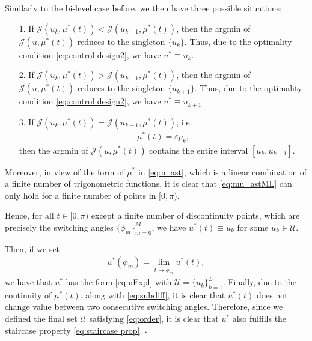 \documentclass[twocolumn]{autart}    %
\begin{document}
Similarly to the bi-level case before, we then have three possible situations:
\begin{itemize}
	\item[1.] If $\mathcal{J}(u_k,\mu^\ast(t)) <  \mathcal{J}(u_{k+1},\mu^\ast(t))$, then the argmin of $\mathcal{J} (u,\mu^\ast(t))$ reduces to the singleton $\{u_k\}$. Thus, due to the optimality condition \eqref{eq:control design2}, we have $u^\ast\equiv u_k$.
	\vspace{0.2cm}
	\item[2.] If $\mathcal{J}(u_k,\mu^\ast(t)) >  \mathcal{J}(u_{k+1},\mu^\ast(t))$, then the argmin of $\mathcal{J} (u,\mu^\ast(t))$ reduces to the singleton $\{u_{k+1}\}$. Thus, due to the optimality condition \eqref{eq:control design2}, we have $u^\ast\equiv u_{k+1}$.
	\vspace{0.2cm}
	\item[3.] If $\mathcal{J}(u_k,\mu^\ast(t)) =  \mathcal{J}(u_{k+1},\mu^\ast(t))$, i.e. 
	\begin{align}\label{eq:mu_astML}
		\mu^\ast (t) = \varepsilon p_k,
	\end{align}
	then the argmin of $\mathcal{J} (u,\mu^\ast(t))$ contains the entire interval $[u_k,u_{k+1}]$.
\end{itemize}

Moreover, in view of the form of $\mu^\ast$ in \eqref{eq:m ast}, which is a linear combination of a finite number of trigonometric functions, it is clear that \eqref{eq:mu_astML} can only hold for a finite number of points in $[0,\pi)$. 

Hence, for all $t\in [0,\pi)$ except a finite number of discontinuity points, which are precisely the switching angles $\{\phi_m\}_{m=0}^M$, we have $u^\ast(t)\equiv u_k$ for some $u_k\in\mathcal U$. 

Then, if we set
\begin{align*}
	u^\ast(\phi_m) = \lim_{t\to\phi_m^+} u^\ast(t),
\end{align*}
we have that $u^\ast$ has the form \eqref{eq:uExpl} with $\mathcal U=\{u_k\}_{k=1}^L$. Finally, due to the continuity of $\mu^\ast(t)$, along with \eqref{eq:subdiff}, it is clear that $u^\ast(t)$ does not change value between two consecutive switching angles. Therefore, since we defined the final set $\mathcal U$ satisfying \eqref{eq:order}, it is clear that $u^\ast$ also fulfills the staircase property \eqref{eq:staircase prop}. \hfill $\square$
\end{document}
